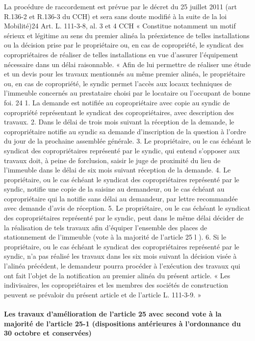 				La procédure de raccordement est prévue par le décret du 25 juillet 2011 (art R.136-2 et R.136-3 du CCH) et sera sans doute modifié à la suite de la loi Mobilité)24
				Art. L. 111-3-8, al. 3 et 4 CCH
				« Constitue notamment un motif sérieux et légitime au sens du premier alinéa la préexistence de telles installations ou la décision prise par le propriétaire ou, en cas de copropriété, le syndicat des copropriétaires de réaliser de telles installations en vue d'assurer l'équipement nécessaire dans un délai raisonnable.
				« Afin de lui permettre de réaliser une étude et un devis pour les travaux mentionnés au même premier alinéa, le propriétaire ou, en cas de copropriété, le syndic permet l'accès aux locaux techniques de l'immeuble concernés au prestataire choisi par le locataire ou l'occupant de bonne foi.
				24
				1. La demande est notifiée au copropriétaire avec copie au syndic de copropriété représentant le syndicat des copropriétaires, avec description des travaux.
				2. Dans le délai de trois mois suivant la réception de la demande, le copropriétaire notifie au syndic sa demande d'inscription de la question à l'ordre du jour de la prochaine assemblée générale.
				3. Le propriétaire, ou le cas échéant le syndicat des copropriétaires représenté par le syndic, qui entend s'opposer aux travaux doit, à peine de forclusion, saisir le juge de proximité du lieu de l'immeuble dans le délai de six mois suivant réception de la demande.
				4. Le propriétaire, ou le cas échéant le syndicat des copropriétaires représenté par le syndic, notifie une copie de la saisine au demandeur, ou le cas échéant au copropriétaire qui la notifie sans délai au demandeur, par lettre recommandée avec demande d'avis de réception.
				5. Le propriétaire, ou le cas échéant le syndicat des copropriétaires représenté par le syndic, peut dans le même délai décider de la réalisation de tels travaux afin d'équiper l'ensemble des places de stationnement de l'immeuble (vote à la majorité de l’article 25 l ).
				6. Si le propriétaire, ou le cas échéant le syndicat des copropriétaires représenté par le syndic, n'a pas réalisé les travaux dans les six mois suivant la décision visée à l'alinéa précédent, le demandeur pourra procéder à l'exécution des travaux qui ont fait l'objet de la notification au premier alinéa du présent article.
				« Les indivisaires, les copropriétaires et les membres des sociétés de construction peuvent se prévaloir du présent article et de l'article L. 111-3-9. »
			
			\paragraph{Les travaux d’amélioration de l’article 25 avec second vote à la majorité de l’article 25-1 (dispositions antérieures à l’ordonnance du 30 octobre et conservées)}
			
